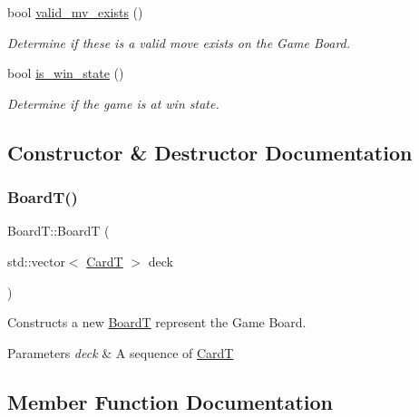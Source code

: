 \begin{DoxyCompactItemize}
bool \hyperlink{class_board_t_a9420e96ccd6692d0e63054277c5ef672}{valid\+\_\+mv\+\_\+exists} ()
\begin{DoxyCompactList}\small\item\em Determine if these is a valid move exists on the Game Board. \end{DoxyCompactList}\item 
bool \hyperlink{class_board_t_a163bed593a3f0ba24dd5401b595b75cd}{is\+\_\+win\+\_\+state} ()
\begin{DoxyCompactList}\small\item\em Determine if the game is at win state. \end{DoxyCompactList}\end{DoxyCompactItemize}


\subsection{Constructor \& Destructor Documentation}
\mbox{\label{class_board_t_a4a25fcb5e2e968e11d50bf6c1bb763a1}} 
\subsubsection{\texorpdfstring{Board\+T()}{BoardT()}}
{\footnotesize\ttfamily Board\+T\+::\+BoardT (\begin{DoxyParamCaption}\item[{std\+::vector$<$ \hyperlink{struct_card_t}{CardT} $>$}]{deck }\end{DoxyParamCaption})}



Constructs a new \hyperlink{class_board_t}{BoardT} represent the Game Board. 


\begin{DoxyParams}{Parameters}
{\em deck} & A sequence of \hyperlink{struct_card_t}{CardT} \\
\hline
\end{DoxyParams}


\subsection{Member Function Documentation}
\mbox{\label{class_board_t_a548e3e518666a6f38b49e072a88a6d2c}} 
